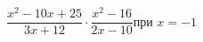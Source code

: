 \begin{ex}[type=expr_calc]
	\begin{condition}
		\( \dfrac{x^2-10x+25}{3x+12}\cdot\dfrac{x^2-16}{2x-10} \)\hspace{0.5cm}при \( x=-1 \)
	\end{condition}
\end{ex}